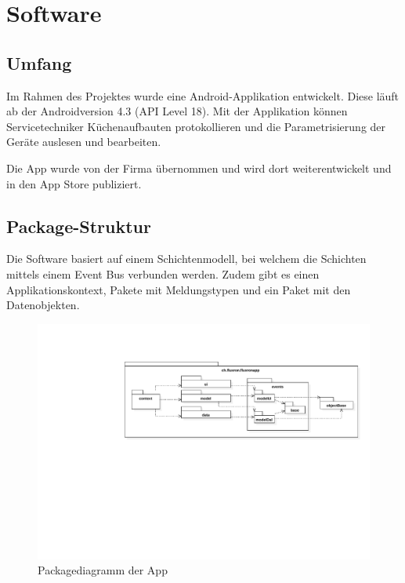 \section{Software}

\subsection{Umfang}

Im Rahmen des Projektes wurde eine Android-Applikation entwickelt. Diese läuft ab der Androidversion 4.3 (API Level 18). Mit der Applikation können Servicetechniker Küchenaufbauten protokollieren und die Parametrisierung der Geräte auslesen und bearbeiten.

Die App wurde von der Firma \fluxron{} übernommen und wird dort weiterentwickelt und in den App Store publiziert.

\subsection{Package-Struktur}

Die Software basiert auf einem Schichtenmodell, bei welchem die Schichten mittels einem Event Bus verbunden werden. Zudem gibt es einen Applikationskontext, Pakete mit Meldungstypen und ein Paket mit den Datenobjekten. 

\begin{figure}[H]
    \begin{center}
        \includegraphics[trim=220 300 0 90,clip,scale=0.7]{results/res/package_diagram}
    \end{center}
    \caption{Packagediagramm der App}
    \label{abb:packages}
\end{figure}

